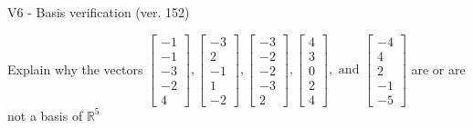 \begin{exercise}
  \begin{exerciseTitle}V6 - Basis verification (ver. 152)\end{exerciseTitle}
  \begin{exerciseStatement}
    Explain why the vectors \(\left[\begin{array}{r}
-1 \\
-1 \\
-3 \\
-2 \\
4
\end{array}\right] , \left[\begin{array}{r}
-3 \\
2 \\
-1 \\
1 \\
-2
\end{array}\right] , \left[\begin{array}{r}
-3 \\
-2 \\
-2 \\
-3 \\
2
\end{array}\right] , \left[\begin{array}{r}
4 \\
3 \\
0 \\
2 \\
4
\end{array}\right] , \text{ and } \left[\begin{array}{r}
-4 \\
4 \\
2 \\
-1 \\
-5
\end{array}\right]\) are or are not a basis of \(\mathbb{R}^5\)	



\end{exerciseStatement}
\end{exercise}
